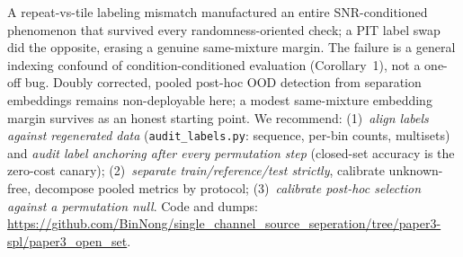 \documentclass[journal,letterpaper]{IEEEtran}
\begin{document}
A repeat-vs-tile labeling mismatch manufactured an entire
SNR-conditioned phenomenon that survived every randomness-oriented
check; a PIT label swap did the opposite, erasing a genuine
same-mixture margin. The failure is a general indexing
confound of condition-conditioned evaluation (Corollary~1), not a
one-off bug. Doubly corrected, pooled
post-hoc OOD detection from separation embeddings remains
non-deployable here; a modest same-mixture embedding margin survives as
an honest starting point. We recommend: (1)~\emph{align labels against
regenerated data} (\texttt{audit\_labels.py}: sequence, per-bin counts,
multisets) and \emph{audit label anchoring after every permutation
step} (closed-set accuracy is the zero-cost canary);
(2)~\emph{separate train/reference/test strictly}, calibrate
unknown-free, decompose pooled metrics by protocol;
(3)~\emph{calibrate post-hoc selection against a permutation null}.
Code and dumps:
\url{https://github.com/BinNong/single_channel_source_seperation/tree/paper3-spl/paper3_open_set}.
\end{document}
